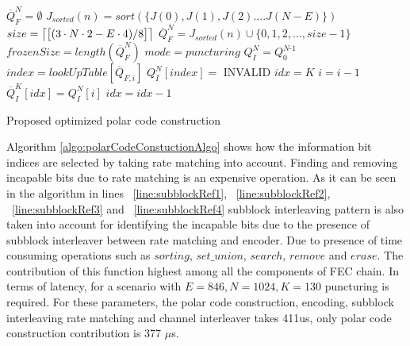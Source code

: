 \IncMargin{1.5em}
\begin{algorithm}[!h]
	$\overline{Q}_{\textit{F}}^{\textit{N}} = \emptyset$ \;
	 {
		 {   %
			$J_{sorted}(n) = sort(\{J(0),J(1),J(2)....J(N-E)\})$\;  \label{line:OptisubblockRef1}
			 {
				$size = \ceil*{\big[(3\cdot N\cdot 2 - E\cdot 4)/8\big]}$\;
			} 
			$\overline{Q}_{F}^{N} = J_{sorted}(n) \cup \{0,1,2, ... ,size-1\}$ \; \label{line:OptisubblockRef2}
			$frozenSize = length(\overline{Q}_{F}^{N})$ \;
			$mode = puncturing$ \;
		} 
	}
	$Q_{\textit{I}}^{\textit{N}} = Q_{\textit{0}}^{\textit{N-1}}$ \;	
	 {
		 {
			$index = lookUpTable[\overline{Q}_{F,i}]$\;
		} 
		$Q_{I}^{N}[index] = $ INVALID \;
	}
	$idx = K$ \;
	 {
		$i = i-1$ \;
		 {
			$\overline{Q}_{\textit{I}}^{\textit{K}}[idx] = Q_{I}^{N}[i]$ \;
			$idx = idx-1$ \;
		}
	}
	\caption{Proposed optimized polar code construction}
	\label{algo:polarCodeConstuctionAlgoOptimized}
\end{algorithm}
\DecMargin{1.5em}

Algorithm \ref{algo:polarCodeConstuctionAlgo} shows how the information bit indices are selected by taking rate matching into account. Finding and removing incapable bits due to rate matching is an expensive operation. As it can be seen in the algorithm in lines ~\ref{line:subblockRef1}, ~\ref{line:subblockRef2}, ~\ref{line:subblockRef3} and ~\ref{line:subblockRef4} subblock interleaving pattern is also taken into account for identifying the incapable bits due to the presence of subblock interleaver between rate matching and encoder. Due to presence of time consuming operations such as $ sorting $, $ set\_union $, $ search $, $ remove $ and $ erase $. The contribution of this function highest among all the components of FEC chain. In terms of latency, for a scenario with $E = 846, N = 1024, K = 130$ puncturing is required. For these parameters, the polar code construction, encoding, subblock interleaving rate matching and channel interleaver takes 411us, only polar code construction contribution is 377 $\mu$s. \newline

